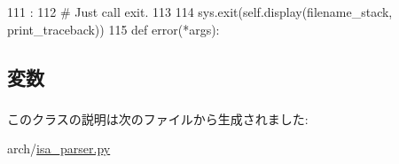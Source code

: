 \begin{DoxyCode}
111                                                          :
112         # Just call exit.
113 
114         sys.exit(self.display(filename_stack, print_traceback))
115 
def error(*args):
\end{DoxyCode}


\subsection{変数}
\hypertarget{classisa__parser_1_1ISAParserError_a20bfe3cddeded33e0531d53de5bdaef5}{
\subsubsection[{lineno}]{}}
\label{classisa__parser_1_1ISAParserError_a20bfe3cddeded33e0531d53de5bdaef5}
\hypertarget{classisa__parser_1_1ISAParserError_a338951b7e7607b65262fb051e7804d91}{
\subsubsection[{string}]{}}
\label{classisa__parser_1_1ISAParserError_a338951b7e7607b65262fb051e7804d91}


このクラスの説明は次のファイルから生成されました:\begin{DoxyCompactItemize}
\item 
arch/\hyperlink{isa__parser_8py}{isa\_\-parser.py}\end{DoxyCompactItemize}
